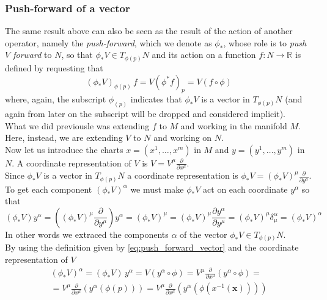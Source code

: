 \documentclass{article}
\begin{document}
\subsubsection*{Push-forward of a vector}
The same result above can also be seen as the result of the action of another operator, namely the \emph{push-forward}, which we denote as $\phi_*$, whose
role is to \emph{push $V$ forward} to $N$, so that $\phi_* V \in T_{\phi(p)} N$ and its action on a function $f: N \to \mathbb{R}$ is defined by requesting that
\begin{equation}
    (\phi_* V)_{\phi(p)} \, f = V(\phi^* f)_p = V(f \circ \phi)
    \label{eq:push_forward_vector}
\end{equation}
where, again, the subscript $\phi_(p)$ indicates that $\phi_* V$ is a vector in $T_{\phi(p)}N$ (and again from later on the subscript will be dropped and considered implicit). \\
What we did previousle was extending $f$ to $M$ and working in the manifold $M$. Here, instead, we are extending $V$ to $N$ and working on $N$. \\
Now let us introduce the charts $x = (x^1, \dots, x^m)$ in $M$ and $ y = (y^1, \dots, y^m)$ in $N$.
A coordinate representation of $V$ is $V = V^\mu \frac{\partial}{\partial x^\mu}$. \\
Since $\phi_* V$ is a vector in $T_{\phi(p)} N$ a coordinate representation is 
$\phi_* V = (\phi_*V)^\mu\frac{\partial}{\partial y^\mu}$. \\
To get each component $(\phi_* V)^\alpha$ we must make $\phi_* V$ act on each coordinate $y^\alpha$ so that
\begin{equation*}
    (\phi_* V)y^\alpha = \left((\phi_*V)^\mu\frac{\partial}{\partial y^\mu}\right) y^\alpha = (\phi_*V)^\mu  = (\phi_*V)^\mu\frac{\partial y^\alpha}{\partial y^\mu} = (\phi_*V)^\mu \delta_\mu^\alpha = (\phi_* V)^\alpha
\end{equation*}
In other words we extraced the components $\alpha$ of the vector $\phi_* V \in T_{\phi(p)}N$. \\
By using the definition given by \ref{eq:push_forward_vector} and the coordinate representation of $V$
\begin{equation}\begin{gathered}
    (\phi_* V)^\alpha = (\phi_* V) \, y^\alpha = V (y^\alpha \circ \phi) = V^\mu \frac{\partial}{\partial x^\mu}(y^\alpha \circ \phi) = \\
    = V^\mu \frac{\partial}{\partial x^\mu}(y^\alpha(\phi(p))) = V^\mu \frac{\partial}{\partial x^\mu}(y^\alpha(\phi(x^{-1}(\textbf{x}))))
    \label{eq:push_forward_coordinates}
\end{gathered}\end{equation}
\end{document}
